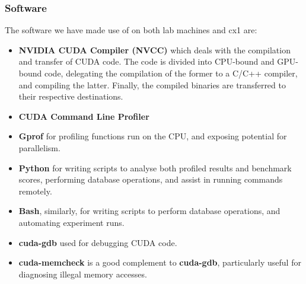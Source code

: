\subsubsection*{Software}
The software we have made use of on both lab machines and cx1 are:
\begin{itemize}
  \item \textbf{NVIDIA CUDA Compiler (NVCC)} which deals with the compilation and transfer of CUDA code. The code is divided into CPU-bound and GPU-bound code, delegating the compilation of the former to a C/C++ compiler, and compiling the latter. Finally, the compiled binaries are transferred to their respective destinations.
  \item \textbf{CUDA Command Line Profiler}
  \item \textbf{Gprof} for profiling functions run on the CPU, and exposing potential for parallelism.
  \item \textbf{Python} for writing scripts to analyse both profiled results and benchmark scores, performing database operations, and assist in running commands remotely.
  \item \textbf{Bash}, similarly, for writing scripts to perform database operations, and automating experiment runs.
  \item \textbf{cuda-gdb} used for debugging CUDA code.
  \item \textbf{cuda-memcheck} is a good complement to \textbf{cuda-gdb}, particularly useful for diagnosing illegal memory accesses.
\end{itemize}